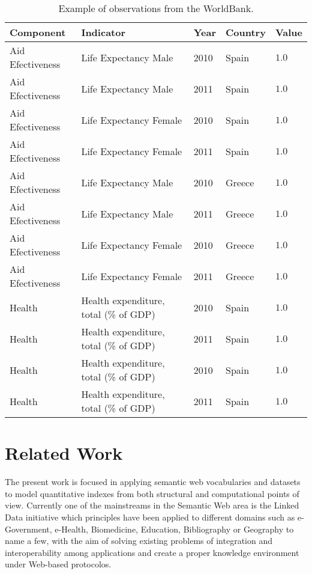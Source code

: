 \documentclass{llncs}
\begin{document}
\begin{table}[!htb]
\renewcommand{\arraystretch}{1.3}
\begin{center}
\begin{tabular}{|p{3cm}||p{5cm}|p{1.8cm}|p{1.8cm}|p{1cm}|}
\hline
  \textbf{Component} & \textbf{Indicator} & \textbf{Year} & \textbf{Country} & \textbf{Value}  \\  \hline
  Aid Efectiveness & Life Expectancy Male & 2010 & Spain & $1.0$ \\ \hline
  Aid Efectiveness & Life Expectancy Male & 2011 & Spain & $1.0$ \\ \hline
  Aid Efectiveness & Life Expectancy Female & 2010 & Spain & $1.0$ \\ \hline
  Aid Efectiveness & Life Expectancy Female & 2011 & Spain & $1.0$ \\ \hline
  Aid Efectiveness & Life Expectancy Male & 2010 & Greece & $1.0$ \\ \hline
  Aid Efectiveness & Life Expectancy Male & 2011 & Greece & $1.0$ \\ \hline
  Aid Efectiveness & Life Expectancy Female & 2010 & Greece & $1.0$ \\ \hline
  Aid Efectiveness & Life Expectancy Female & 2011 & Greece & $1.0$ \\ \hline
  Health & Health expenditure, total (\% of GDP) & 2010 & Spain & $1.0$ \\ \hline
  Health & Health expenditure, total (\% of GDP) & 2011 & Spain & $1.0$ \\ \hline
  Health & Health expenditure, total (\% of GDP) & 2010 & Spain & $1.0$ \\ \hline
  Health & Health expenditure, total (\% of GDP) & 2011 & Spain & $1.0$ \\ \hline
  \hline
  \end{tabular}
  \caption{Example of observations from the WorldBank.}
  \label{tab:example-wb}
  \end{center}
\end{table} 


\section{Related Work}
The present work is focused in applying semantic web vocabularies and datasets to model 
quantitative indexes from both structural and computational points of view. Currently one 
of the mainstreams in the Semantic Web area is the Linked Data initiative which principles 
have been applied to different domains such as  e-Government, e-Health, Biomedicine, Education, Bibliography or Geography 
to name a few,  with the aim of solving existing problems of integration and interoperability 
among applications and create a proper knowledge environment under Web-based protocolos. 
\end{document}
